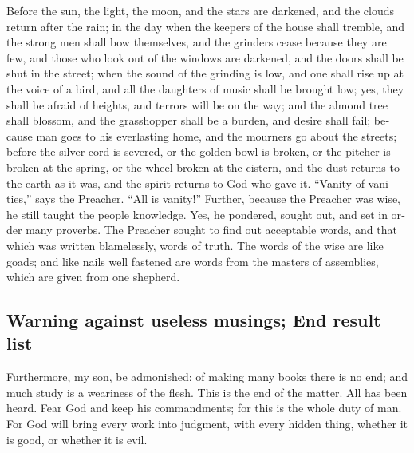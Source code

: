 \begin{paracol}{2}
\begin{otherlanguage}{english}
 Before the sun, the light, the moon, and the stars are
darkened, and the clouds return after the rain;  in the
day when the keepers of the house shall tremble, and the strong men
shall bow themselves, and the grinders cease because they are few, and
those who look out of the windows are darkened,  and the
doors shall be shut in the street; when the sound of the grinding is
low, and one shall rise up at the voice of a bird, and all the daughters
of music shall be brought low;  yes, they shall be afraid
of heights, and terrors will be on the way; and the almond tree shall
blossom, and the grasshopper shall be a burden, and desire shall fail;
because man goes to his everlasting home, and the mourners go about the
streets;  before the silver cord is severed, or the golden
bowl is broken, or the pitcher is broken at the spring, or the wheel
broken at the cistern,  and the dust returns to the earth
as it was, and the spirit returns to God who gave it. 
``Vanity of vanities,'' says the Preacher. ``All is vanity!''
 Further, because the Preacher was wise, he still taught
the people knowledge. Yes, he pondered, sought out, and set in order
many proverbs.  The Preacher sought to find out
acceptable words, and that which was written blamelessly, words of
truth.  The words of the wise are like goads; and like
nails well fastened are words from the masters of assemblies, which are
given from one shepherd.

\hypertarget{warning-against-useless-musings-end-result-list}{%
\subsection{Warning against useless musings; End result
list}\label{warning-against-useless-musings-end-result-list}}

 Furthermore, my son, be admonished: of making many books
there is no end; and much study is a weariness of the flesh.
 This is the end of the matter. All has been heard. Fear
God and keep his commandments; for this is the whole duty of man.
 For God will bring every work into judgment, with every
hidden thing, whether it is good, or whether it is evil.
\end{otherlanguage} \end{paracol}
